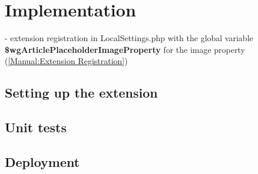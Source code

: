 	\section{Implementation}
	
	- extension registration in LocalSettings.php with the global variable \textbf{\$wgArticlePlaceholderImageProperty} for the image property (\href{https://www.mediawiki.org/wiki/Manual:Extension_registration}{[Manual:Extension Registration]})\\
	\subsection{Setting up the extension}
	
	
	
	
	
	
	\subsection{Unit tests}
	\subsection{Deployment}
	